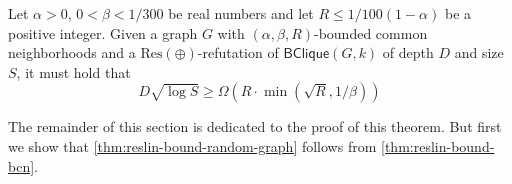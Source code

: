 \documentclass[10pt,a4paper]{article}
\theoremstyle{definition}
\theoremstyle{remark}
\theoremstyle{example}
\theoremstyle{plain}
\newcommand{\CNbound}{R}
\newcommand{\ResLin}{\textrm{Res}(\oplus)}
\newcommand{\binClique}[2]{\mathsf{BClique}({#1}, {#2})}
\newcommand{\binCliqueGk}{\binClique{G}{k}}
\newcommand{\edgeProbResLin}{\alpha}
\newcommand{\betabound}{1/300}
\newcommand{\rbound}{1/100(1-\edgeProbResLin)}
\begin{document}
\begin{theorem}
    \label{thm:reslin-bound-bcn}
    Let $\edgeProbResLin>0$, $0<\beta<\betabound$ be real numbers and let $\CNbound\leq \rbound$ be a positive integer. Given a graph $G$ with $(\edgeProbResLin,\beta,\CNbound)$-bounded common neighborhoods and a $\ResLin$-refutation of $\binCliqueGk$ of depth $D$ and size $S$, it must hold that 
    \begin{equation*}
        D\sqrt{\log S}\geq\Omega(\CNbound\cdot\min(\sqrt\CNbound,1/\beta))
    \end{equation*}
\end{theorem}

The remainder of this section is dedicated to the proof of this theorem. But first we show that \autoref{thm:reslin-bound-random-graph} follows from \autoref{thm:reslin-bound-bcn}.
\end{document}
